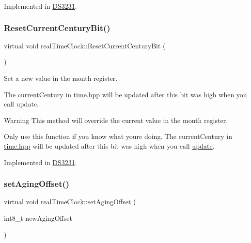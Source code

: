 Implemented in \mbox{\hyperlink{class_d_s3231_aee77c6ecb3c292d375eebe7e58ebb024}{D\+S3231}}.

\mbox{\label{classreal_time_clock_a7e306358a315d54f4fa02ef0f792573b}} 
\subsubsection{\texorpdfstring{Reset\+Current\+Century\+Bit()}{ResetCurrentCenturyBit()}}
{\footnotesize\ttfamily virtual void real\+Time\+Clock\+::\+Reset\+Current\+Century\+Bit (\begin{DoxyParamCaption}{ }\end{DoxyParamCaption})\hspace{0.3cm}{\ttfamily [pure virtual]}}



Set a new value in the month register. 

The current\+Century in \mbox{\hyperlink{time_8hpp_source}{time.\+hpp}} will be updated after this bit was high when you call update. \begin{DoxyWarning}{Warning}
This method will override the current value in the month register. 

Only use this function if you know what you\textquotesingle{}re doing. The current\+Century in \mbox{\hyperlink{time_8hpp_source}{time.\+hpp}} will be updated after this bit was high when you call \mbox{\hyperlink{classreal_time_clock_afb5132ca3cbe80552a88041cead0a2b3}{update}}. 
\end{DoxyWarning}


Implemented in \mbox{\hyperlink{class_d_s3231_a7559512806e2cc6f68a87ed3e15a53c8}{D\+S3231}}.

\mbox{\label{classreal_time_clock_aacf97da86677ee3fb55b5180ba5c0727}} 
\subsubsection{\texorpdfstring{set\+Aging\+Offset()}{setAgingOffset()}}
{\footnotesize\ttfamily virtual void real\+Time\+Clock\+::set\+Aging\+Offset (\begin{DoxyParamCaption}\item[{int8\+\_\+t}]{new\+Aging\+Offset }\end{DoxyParamCaption})\hspace{0.3cm}{\ttfamily [pure virtual]}}



